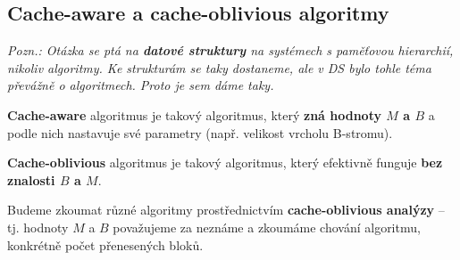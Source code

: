 \documentclass[11pt]{report} %
\numberwithin{equation}{section}
\begin{document}
\subsection{Cache-aware a cache-oblivious algoritmy}
\textit{Pozn.: Otázka se ptá na \textbf{datové struktury} na systémech s paměťovou hierarchií, nikoliv algoritmy. Ke strukturám se taky dostaneme, ale v DS bylo tohle téma převážně o algoritmech. Proto je sem dáme taky.}

\textbf{Cache-aware} algoritmus je takový algoritmus, který \textbf{zná hodnoty $M$ a $B$} a podle nich nastavuje své parametry (např. velikost vrcholu B-stromu).

\textbf{Cache-oblivious} algoritmus je takový algoritmus, který efektivně funguje \textbf{bez znalosti $B$ a $M$}. 

Budeme zkoumat různé algoritmy prostřednictvím \textbf{cache-oblivious analýzy} -- tj. hodnoty $M$ a $B$ považujeme za neznáme a zkoumáme chování algoritmu, konkrétně počet přenesených bloků. 
\end{document}
